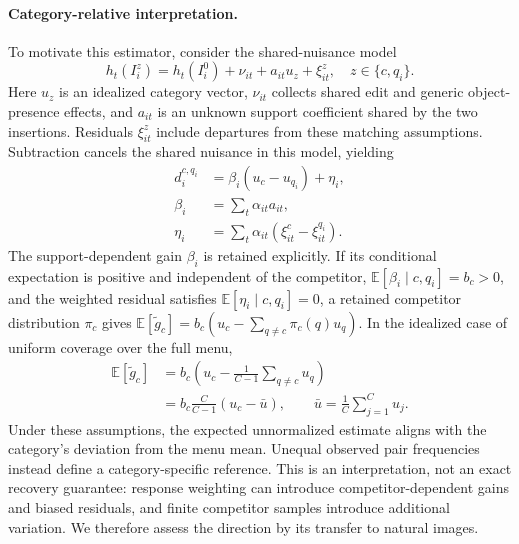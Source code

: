 \paragraph{Category-relative interpretation.}
To motivate this estimator, consider the shared-nuisance model
\begin{equation}
    h_t(I_i^z)
    =
    h_t(I_i^0)+\nu_{it}+a_{it}u_z+\xi_{it}^z,
    \quad z\in\{c,q_i\}.
    \label{eq:contrast_decomposition}
\end{equation}
Here \(u_z\) is an idealized category vector, \(\nu_{it}\) collects shared
edit and generic object-presence effects, and \(a_{it}\) is an unknown
support coefficient shared by the two insertions. Residuals
\(\xi_{it}^z\) include departures from these matching assumptions.
Subtraction cancels the shared nuisance in this model, yielding
\begin{equation}
    \begin{aligned}
        d_i^{c,q_i}&=\beta_i(u_c-u_{q_i})+\eta_i,\\
        \beta_i&=\sum_t\alpha_{it}a_{it},\\
        \eta_i&=\sum_t\alpha_{it}
            (\xi_{it}^c-\xi_{it}^{q_i}).
    \end{aligned}
    \label{eq:contrast_identity}
\end{equation}
The support-dependent gain \(\beta_i\) is retained explicitly.
If its conditional expectation is positive and independent of the
competitor, \(\mathbb E[\beta_i\mid c,q_i]=b_c>0\), and the
weighted residual satisfies \(\mathbb E[\eta_i\mid c,q_i]=0\),
a retained competitor distribution \(\pi_c\) gives
\(\mathbb E[\widetilde g_c]=b_c(u_c-\sum_{q\neq c}\pi_c(q)u_q)\).
In the idealized case of uniform coverage over the full menu,
\begin{equation}
    \begin{aligned}
        \mathbb E[\widetilde g_c]
        &=b_c\left(u_c-\frac{1}{C-1}\sum_{q\neq c}u_q\right)\\
        &=b_c\frac{C}{C-1}(u_c-\bar u),
        \qquad \bar u=\frac1C\sum_{j=1}^C u_j.
    \end{aligned}
    \label{eq:centroid_interpretation}
\end{equation}
Under these assumptions, the expected unnormalized estimate aligns with
the category's deviation from the menu mean. Unequal observed pair
frequencies instead define a category-specific reference. This is an
interpretation, not an exact recovery guarantee: response weighting can
introduce competitor-dependent gains and biased residuals, and finite
competitor samples introduce additional variation. We therefore assess
the direction by its transfer to natural images.

